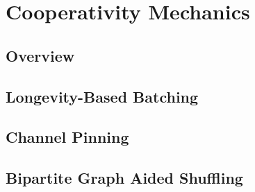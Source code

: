 \section{Cooperativity Mechanics}\label{sec:cooperativity mechanics}

\subsection{Overview}\label{sec:cooperativity mechanics overview}
\subsection{Longevity-Based Batching}\label{sec:longevity based batching}
\subsection{Channel Pinning}\label{sec:channel pinning}
\subsection{Bipartite Graph Aided Shuffling}
    \label{sec:bipartite graph aided shuffling}


